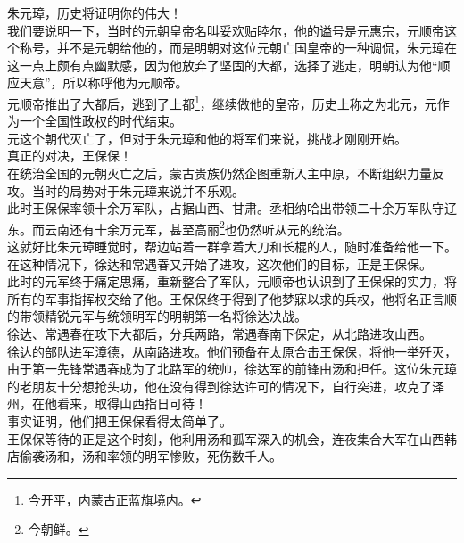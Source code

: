 \begin{multicols}{\theparacolNo}
朱元璋，历史将证明你的伟大！\\

我们要说明一下，当时的元朝皇帝名叫妥欢贴睦尔，他的谥号是元惠宗，元顺帝这个称号，并不是元朝给他的，而是明朝对这位元朝亡国皇帝的一种调侃，朱元璋在这一点上颇有点幽默感，因为他放弃了坚固的大都，选择了逃走，明朝认为他“顺应天意”，所以称呼他为元顺帝。\\

元顺帝推出了大都后，逃到了上都\footnote{今开平，内蒙古正蓝旗境内。}，继续做他的皇帝，历史上称之为北元，元作为一个全国性政权的时代结束。\\

元这个朝代灭亡了，但对于朱元璋和他的将军们来说，挑战才刚刚开始。\\

真正的对决，王保保！\\

在统治全国的元朝灭亡之后，蒙古贵族仍然企图重新入主中原，不断组织力量反攻。当时的局势对于朱元璋来说并不乐观。\\

此时王保保率领十余万军队，占据山西、甘肃。丞相纳哈出带领二十余万军队守辽东。而云南还有十余万元军，甚至高丽\footnote{今朝鲜。}也仍然听从元的统治。\\

这就好比朱元璋睡觉时，帮边站着一群拿着大刀和长棍的人，随时准备给他一下。\\

在这种情况下，徐达和常遇春又开始了进攻，这次他们的目标，正是王保保。\\

此时的元军终于痛定思痛，重新整合了军队，元顺帝也认识到了王保保的实力，将所有的军事指挥权交给了他。王保保终于得到了他梦寐以求的兵权，他将名正言顺的带领精锐元军与统领明军的明朝第一名将徐达决战。\\

徐达、常遇春在攻下大都后，分兵两路，常遇春南下保定，从北路进攻山西。\\

徐达的部队进军漳德，从南路进攻。他们预备在太原合击王保保，将他一举歼灭，由于第一先锋常遇春成为了北路军的统帅，徐达军的前锋由汤和担任。这位朱元璋的老朋友十分想抢头功，他在没有得到徐达许可的情况下，自行突进，攻克了泽州，在他看来，取得山西指日可待！\\

事实证明，他们把王保保看得太简单了。\\

王保保等待的正是这个时刻，他利用汤和孤军深入的机会，连夜集合大军在山西韩店偷袭汤和，汤和率领的明军惨败，死伤数千人。\\


\end{multicols}
